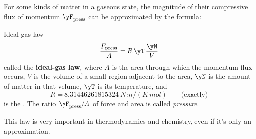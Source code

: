 For some kinds of matter in a gaseous state, the magnitude of their compressive flux of momentum $\yF_{\text{press}}$ can be approximated by the formula:
\begin{definition}{Ideal-gas law}
  \begin{equation*}
    \frac{F_{\text{press}}}{A} = R\,\yT\,\frac{\yN}{V}
  \end{equation*}
  called the \textbf{ideal-gas law}, where $A$ is the area through which the momentum flux occurs, $V$ is the volume of a small region adjacent to the area, $\yN$ is the amount of matter in that volume, $\yT$ is its temperature, and $$R = \qty{8.31446261815324}{N\,m/(K\,mol)}\qquad\text{(exactly)}$$ is the . The ratio $\yF_{\text{press}}/A$ of force and area is called \emph{pressure}.
\end{definition}
%
This law is very important in thermodynamics and chemistry, even if it's only an approximation.

